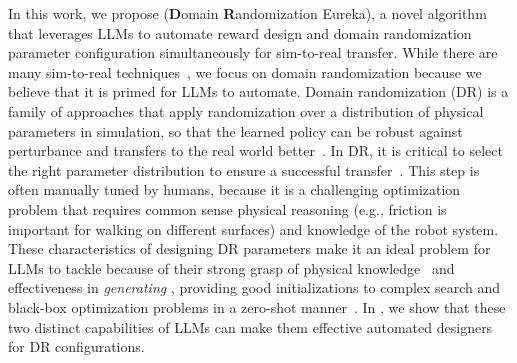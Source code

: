 \documentclass[conference]{IEEEtran}
\begin{document}
In this work, we propose \ourmethod (\textbf{D}omain \textbf{R}andomization Eureka), a novel algorithm that leverages LLMs to automate reward design and domain randomization parameter configuration simultaneously for sim-to-real transfer. While there are many sim-to-real techniques~\citep{aastrom1971system,jaquier2023transfer,muratore2022robot}, we focus on domain randomization because we believe that it is primed for LLMs to automate. Domain randomization (DR) is a family of approaches that apply randomization over a distribution of physical parameters in simulation, so that the learned policy can be robust against perturbance and transfers to the real world better~\citep{tobin2017domain,peng2018sim,muratore2022robot}. In DR, it is critical to select the right parameter distribution to ensure a successful transfer~\citep{vuong2019pick,kumar2021rma}. This step is often manually tuned by humans, because it is a challenging optimization problem that requires common sense physical reasoning (e.g., friction is important for walking on different surfaces) and knowledge of the robot system.
These characteristics of designing DR parameters make it an ideal problem for LLMs to tackle because of their strong grasp of physical knowledge~\citep{ahn2022can, wang2023newton} and effectiveness in \textit{generating }, providing good initializations to complex search and black-box optimization problems in a zero-shot manner~\citep{yang2023large,zhang2023using,anonymous2024large,ma2023eureka,romera2023mathematical}. In \ourmethod, we show that these two distinct capabilities of LLMs can make them effective automated designers for DR configurations. 
\end{document}
